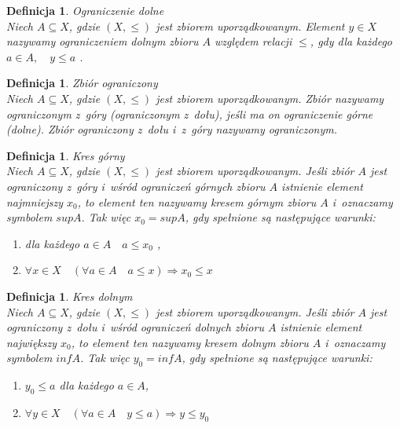 \documentclass[12pt,a4paper]{report}
\newtheorem{definition}[theorem]{Definicja}
\begin{document}
\begin{definition}{Ograniczenie dolne \cite[Rozdział 2]{blaszczyk2007}}\\
Niech $A \subseteq X$, gdzie $(X, \leq)$ jest zbiorem uporządkowanym. Element $y \in X$ nazywamy ograniczeniem dolnym zbioru $A$ względem relacji $\leq$, gdy dla każdego $a \in A, \quad y \leq a$ . 
\end{definition}


\begin{definition}{Zbiór ograniczony \cite[Rozdział 2]{blaszczyk2007}}\\
Niech $A \subseteq X$, gdzie $(X, \leq)$ jest zbiorem uporządkowanym. Zbiór nazywamy ograniczonym z~góry (ograniczonym z~dołu), jeśli ma on ograniczenie górne (dolne). Zbiór ograniczony z~dołu i~z~góry nazywamy ograniczonym. 
\end{definition}


\begin{definition}{Kres górny \cite[Rozdział 2]{blaszczyk2007}}\\
Niech $A \subseteq X$, gdzie $(X, \leq)$ jest zbiorem uporządkowanym. Jeśli zbiór $A$ jest ograniczony z~góry i~wśród ograniczeń górnych zbioru $A$ istnienie element najmniejszy $x_0$, to element ten nazywamy kresem górnym zbioru $A$ i~oznaczamy symbolem $sup A$. Tak więc $x_0 =sup A$, gdy spełnione są następujące warunki:
\begin{enumerate}
\item dla każdego $a \in A \quad a \leq x_0$ ,
\item $\forall x \in X \quad ( \forall a\in A  \quad a\leq x)  \Rightarrow x_0 \leq x$
\end{enumerate}
\end{definition}


\begin{definition}{Kres dolnym \cite[Rozdział 2]{blaszczyk2007}}\\
Niech $A \subseteq X$, gdzie $(X, \leq)$ jest zbiorem uporządkowanym. Jeśli zbiór $A$ jest ograniczony z~dołu i~wśród ograniczeń dolnych zbioru $A$ istnienie element największy $x_0$, to element ten nazywamy kresem dolnym zbioru $A$ i~oznaczamy symbolem $inf A$. Tak więc $y_0 =inf A$, gdy spełnione są następujące warunki:
\begin{enumerate}
\item $y_0 \leq a$ dla każdego $a \in A$,
\item $\forall y \in X \quad ( \forall a\in A  \quad y\leq a)  \Rightarrow y \leq y_0$
\end{enumerate}
\end{definition}
\end{document}
